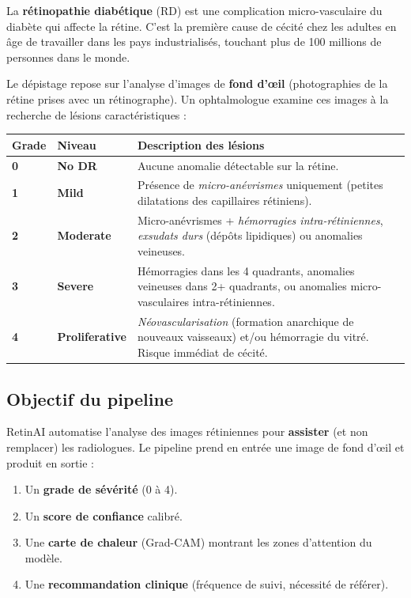 \documentclass[11pt,a4paper]{article}
\begin{document}
La \textbf{rétinopathie diabétique} (RD) est une complication micro-vasculaire du diabète qui affecte la rétine. C'est la première cause de cécité chez les adultes en âge de travailler dans les pays industrialisés, touchant plus de 100 millions de personnes dans le monde.

Le dépistage repose sur l'analyse d'images de \textbf{fond d'œil} (photographies de la rétine prises avec un rétinographe). Un ophtalmologue examine ces images à la recherche de lésions caractéristiques :

\begin{center}
\renewcommand{\arraystretch}{1.4}
\begin{tabularx}{\textwidth}{>{\bfseries}l>{\bfseries}lX}
\toprule
Grade & Niveau & Description des lésions \\
\midrule
\cellcolor{mygreen!10} 0 & No DR & Aucune anomalie détectable sur la rétine. \\
\cellcolor{myblue!10} 1 & Mild & Présence de \textit{micro-anévrismes} uniquement (petites dilatations des capillaires rétiniens). \\
\cellcolor{myorange!10} 2 & Moderate & Micro-anévrismes + \textit{hémorragies intra-rétiniennes}, \textit{exsudats durs} (dépôts lipidiques) ou anomalies veineuses. \\
\cellcolor{myred!10} 3 & Severe & Hémorragies dans les 4 quadrants, anomalies veineuses dans 2+ quadrants, ou anomalies micro-vasculaires intra-rétiniennes. \\
\cellcolor{myred!30} 4 & Proliferative & \textit{Néovascularisation} (formation anarchique de nouveaux vaisseaux) et/ou hémorragie du vitré. Risque immédiat de cécité. \\
\bottomrule
\end{tabularx}
\end{center}

\subsection{Objectif du pipeline}

RetinAI automatise l'analyse des images rétiniennes pour \textbf{assister} (et non remplacer) les radiologues. Le pipeline prend en entrée une image de fond d'œil et produit en sortie :

\begin{enumerate}[leftmargin=2em]
  \item Un \textbf{grade de sévérité} (0 à 4).
  \item Un \textbf{score de confiance} calibré.
  \item Une \textbf{carte de chaleur} (Grad-CAM) montrant les zones d'attention du modèle.
  \item Une \textbf{recommandation clinique} (fréquence de suivi, nécessité de référer).
\end{enumerate}
\end{document}
